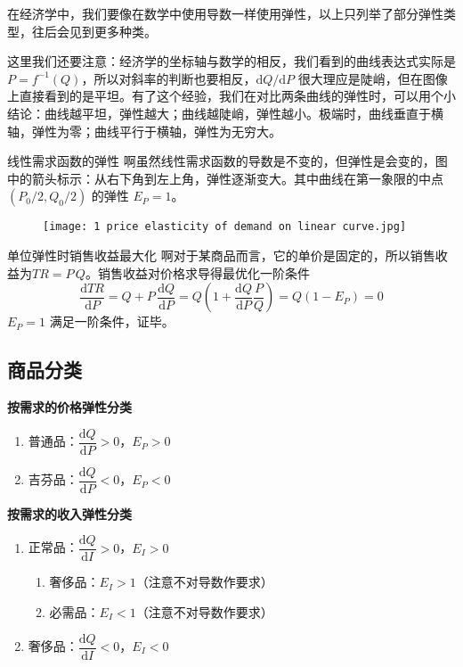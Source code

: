 在经济学中，我们要像在数学中使用导数一样使用弹性，以上只列举了部分弹性类型，往后会见到更多种类。

这里我们还要注意：经济学的坐标轴与数学的相反，我们看到的曲线表达式实际是 $P=f^{-1}\left(Q\right)$，所以对斜率的判断也要相反，$\mathrm dQ/\mathrm dP$ 很大理应是陡峭，但在图像上直接看到的是平坦。有了这个经验，我们在对比两条曲线的弹性时，可以用个小结论：曲线越平坦，弹性越大；曲线越陡峭，弹性越小。极端时，曲线垂直于横轴，弹性为零；曲线平行于横轴，弹性为无穷大。

\begin{graph}[breakable]{线性需求函数的弹性}
    啊虽然线性需求函数的导数是不变的，但弹性是会变的，图中的箭头标示：从右下角到左上角，弹性逐渐变大。其中曲线在第一象限的中点 $\left(P_0/2,Q_0/2\right)$ 的弹性 $E_P=1$。
\end{graph}
\begin{figure}[H]
    \centering
    \texttt{[image: 1 price elasticity of demand on linear curve.jpg]}
\end{figure}

\begin{derive}[breakable]{单位弹性时销售收益最大化}
    啊对于某商品而言，它的单价是固定的，所以销售收益为$TR=P\,Q$。销售收益对价格求导得最优化一阶条件
    $$\frac{\mathrm{d}TR}{\mathrm{d}P}=Q+P\,\frac{\mathrm{d}Q}{\mathrm{d}P}=Q\left( 1+\frac{\mathrm{d}Q}{\mathrm{d}P}\frac{P}{Q} \right) =Q\left( 1-E_P \right)=0$$
    $E_P=1$ 满足一阶条件，证毕。
\end{derive}

\subsection{商品分类}

\noindent\textbf{按需求的价格弹性分类}
\begin{enumerate}
    \item 普通品：$\dfrac{\mathrm dQ}{\mathrm dP}>0$，$E_P>0$
    \item 吉芬品：$\dfrac{\mathrm dQ}{\mathrm dP}<0$，$E_P<0$
\end{enumerate}
\vspace{1em}

\noindent\textbf{按需求的收入弹性分类}
\begin{enumerate}
    \item 正常品：$\dfrac{\mathrm dQ}{\mathrm dI}>0$，$E_I>0$
    \begin{enumerate}
        \item 奢侈品：$E_I>1$（注意不对导数作要求）
        \item 必需品：$E_I<1$（注意不对导数作要求）
    \end{enumerate}
    \item 奢侈品：$\dfrac{\mathrm dQ}{\mathrm dI}<0$，$E_I<0$
\end{enumerate}
\vspace{1em}

